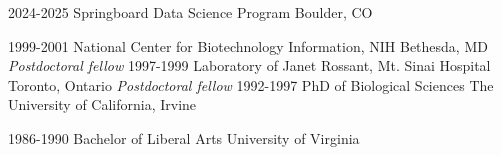 \documentclass[]{dmc-cv} %
\begin{document}
\begin{entrylist}
\entry 
{2024-2025}
{Springboard Data Science Program}
{Boulder, CO}
{
}

\entry
{1999-2001}
{National Center for Biotechnology Information, NIH}
{Bethesda, MD}
{\emph{Postdoctoral fellow}
}
\entry
{1997-1999}
{Laboratory of Janet Rossant, Mt. Sinai Hospital}
{Toronto, Ontario}
{\emph{Postdoctoral fellow}
}
\entry
{1992-1997}
{PhD {\normalfont of Biological Sciences}}
{The University of California, Irvine}

\entry
{1986-1990}
{Bachelor {\normalfont of Liberal Arts}}
{University of Virginia}

\end{entrylist}








\end{document}
